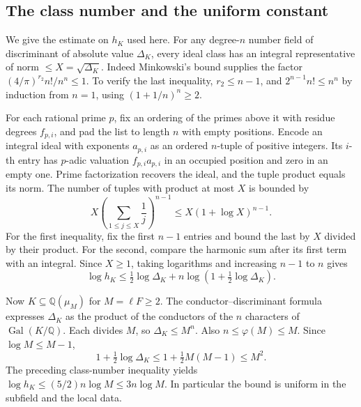 \subsection{The class number and the uniform constant}

We give the estimate on \(h_K\) used here. For any degree-\(n\)
number field of discriminant of absolute value \(\Delta_K\), every
ideal class has an integral representative of norm
\(\le X=\sqrt{\Delta_K}\). Indeed Minkowski's bound supplies the
factor \((4/\pi)^{r_2}n!/n^n\le1\). To verify the last inequality,
\(r_2\le n-1\), and \(2^{n-1}n!\le n^n\) by induction from \(n=1\),
using \((1+1/n)^n\ge2\).

For each rational prime \(p\), fix an ordering of the primes above
it with residue degrees \(f_{p,i}\), and pad the list to length \(n\)
with empty positions. Encode an integral ideal with exponents
\(a_{p,i}\) as an ordered \(n\)-tuple of positive integers. Its
\(i\)-th entry has \(p\)-adic valuation \(f_{p,i}a_{p,i}\) in an
occupied position and zero in an empty one. Prime factorization
recovers the ideal, and the tuple product equals its norm. The number
of tuples with product at most \(X\) is bounded by
\[
 X\left(\sum_{1\le j\le X}\frac1j\right)^{n-1}
       \le X(1+\log X)^{n-1}.
\]
For the first inequality, fix the first \(n-1\) entries and bound
the last by \(X\) divided by their product. For the second, compare
the harmonic sum after its first term with an integral.
Since \(X\ge1\), taking logarithms and increasing \(n-1\) to \(n\)
gives
\[
  \log h_K\le \tfrac12\log\Delta_K+
                       n\log(1+\tfrac12\log\Delta_K).
\]

Now \(K\subseteq\mathbb Q(\mu_M)\) for \(M=\ell F\ge2\).
The conductor--discriminant formula expresses \(\Delta_K\) as the
product of the conductors of the \(n\) characters of
\(\operatorname{Gal}(K/\mathbb Q)\). Each divides \(M\), so
\(\Delta_K\le M^n\). Also \(n\le\varphi(M)\le M\). Since
\(\log M\le M-1\),
\[
   1+\tfrac12\log\Delta_K\le 1+\tfrac12 M(M-1)\le M^2.
\]
The preceding class-number inequality yields
\(\log h_K\le(5/2)n\log M\le3n\log M\).
In particular the bound is uniform in the subfield and the local data.


